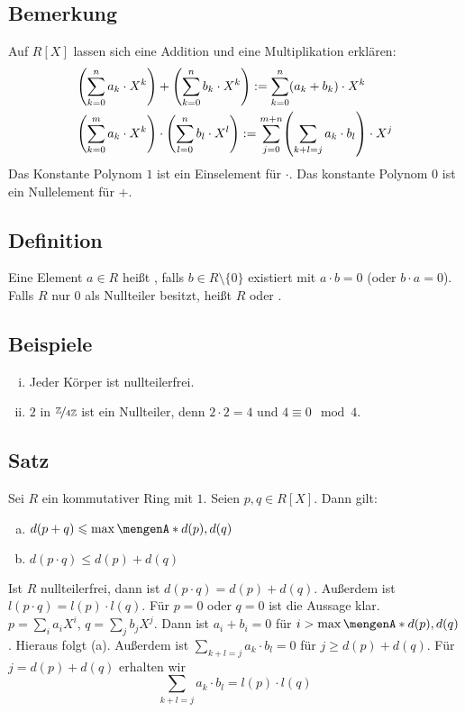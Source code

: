 \subsection[Bemerkung: Addition und Multiplikation auf {$R[X]$}]{Bemerkung} %
\label{sub:54}
Auf $R[X]$ lassen sich eine Addition und eine Multiplikation erklären:
\begin{align*}
	&\enbrace*{\sum_{k=0}^{n} a_k \cdot X^k} + \enbrace*{\sum_{k=0}^{n} b_k \cdot X^k} := \sum_{k=0}^{n} (a_k + b_k) \cdot X^k  \\
	& \enbrace*{\sum_{k=0}^{m} a_k \cdot X^k} \cdot \enbrace*{\sum_{l=0}^{n} b_l \cdot X^l} :=  \sum_{j=0}^{m+n} \enbrace*{\sum_{k+l=j} a_k \cdot b_l } \cdot X^j 
\end{align*}
Das Konstante Polynom $1$ ist ein Einselement für $\cdot $. Das konstante Polynom $0$ ist ein Nullelement für $+$.

\subsection[Definition: Nullteiler, Integritätsring]{Definition} %
\label{sub:55}
Eine Element $a \in R$ heißt , falls $b \in R\setminus \{0\}$ existiert mit $a \cdot b = 0$ (oder $b \cdot a=0$). Falls $R$ nur $0$ als Nullteiler besitzt,
heißt $R$  oder .   

\subsection[Beispiele zu Nullteilern]{Beispiele} %
\label{sub:56}
\begin{enumerate}[(i)]
	\item Jeder Körper ist nullteilerfrei.
	\item $2$ in $\nicefrac{\mathds{Z}}{4 \mathds{Z}}$ ist ein Nullteiler, denn $2 \cdot 2 =4$ und $4 \equiv 0 \mod 4$.
\end{enumerate}

\subsection[Satz: Abschätzungen für den Grad eines Polynoms]{Satz} %
\label{sub:57}
Sei $R$ ein kommutativer Ring mit $1$. Seien $p,q \in R[X]$. Dann gilt:
\begin{enumerate}[(a)]
	\item $d(p+q) \le \max \set{d(p), d(q)} $
	\item $d(p \cdot q) \le d(p)+ d(q)$
\end{enumerate}
Ist $R$ nullteilerfrei, dann ist $d(p \cdot q) = d(p)+ d(q)$. Außerdem ist $l(p \cdot q)= l(p) \cdot l(q)$.
Für $p=0$ oder $q=0$ ist die Aussage klar. \\ $p = \sum_i a_i X^i $, $q = \sum_j b_j X^j$. Dann ist $a_i + b_i = 0$ für $i > \max \set{d(p), d(q)} $. Hieraus folgt (a).
Außerdem ist $\sum_{k+l=j} a_k \cdot b_l= 0$ für $j\ge d(p)+ d(q)$. Für $j= d(p)+ d(q)$ erhalten wir
\[
	\sum_{k+l=j} a_k \cdot b_l = l(p) \cdot l(q)
\]

